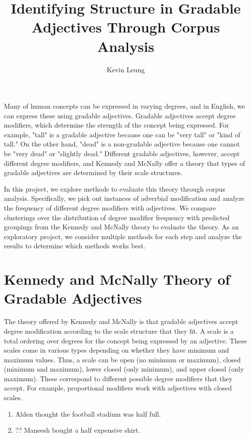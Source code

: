 \documentclass[11pt]{amsart}
\title{Identifying Structure in Gradable Adjectives Through Corpus Analysis}
\author{Kevin Leung}
\begin{document}
\maketitle

Many of human concepts can be expressed in varying degrees, and in English, we can express these using gradable adjectives. Gradable adjectives accept degree modifiers, which determine the strength of the concept being expressed. For example, "tall" is a gradable adjective because one can be "very tall" or "kind of tall." On the other hand, "dead" is a non-gradable adjective because one cannot be "very dead" or "slightly dead." Different gradable adjectives, however, accept different degree modifiers, and Kennedy and McNally\cite{kennedymcnally} offer a theory that types of gradable adjectives are determined by their scale structures.

In this project, we explore methods to evaluate this theory through corpus analysis. Specifically, we pick out instances of adverbial modification and analyze the frequency of different degree modifiers with adjectives. We compare clusterings over the distribution of degree modifier frequency with predicted groupings from the Kennedy and McNally theory to evaluate the theory. As an exploratory project, we consider multiple methods for each step and analyze the results to determine which methods works best.

\section{Kennedy and McNally Theory of Gradable Adjectives}
The theory offered by Kennedy and McNally\cite{kennedymcnally} is that gradable adjectives accept degree modification according to the scale structure that they fit. A scale is a total ordering over degrees for the concept being expressed by an adjective. These scales come in various types depending on whether they have minimum and maximum values. Thus, a scale can be open (no minimum or maximum), closed (minimum and maximum), lower closed (only minimum), and upper closed (only maximum). These correspond to different possible degree modifiers that they accept. For example, proportional modifiers work with adjectives with closed scales.

\begin{enumerate}
\item Alden thought the football stadium was half full.
\item ?? Maneesh bought a half expensive shirt.
\end{enumerate}
\end{document}
